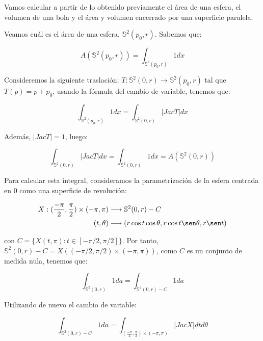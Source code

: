 Vamos calcular a partir de lo obtenido previamente el área de una esfera, el volumen de una bola y el área y volumen encerrado por una superficie paralela.

\begin{remark}
Veamos cuál es el área de una esfera, $\mathbb{S}^2(p_0, r)$. Sabemos que:

\begin{equation*}
    A(\mathbb{S}^2(p_0, r)) = \int_{\mathbb{S}^2(p_0, r)} 1dx
\end{equation*}

Consideremos la siguiente traslación: $T: \mathbb{S}^2(0, r) \longrightarrow \mathbb{S}^2(p_0, r)$ tal que $T(p) = p + p_0$, usando la fórmula del cambio de variable, tenemos que:

\begin{equation*}
    \int_{\mathbb{S}^2(p_0, r)} 1dx = \int_{\mathbb{S}^2(0, r)} |Jac T|dx 
\end{equation*}

Además, $|JacT|=1$, luego:

\begin{equation*}
    \int_{\mathbb{S}^2(0, r)} |Jac T|dx = \int_{\mathbb{S}^2(0, r)} 1dx = A(\mathbb{S}^2(0, r))
\end{equation*}

Para calcular esta integral, consideramos la parametrización de la esfera centrada en 0 como una superficie de revolución: 

\begin{align*}
    X: (\frac{-\pi}{2}, \frac{\pi}{2}) \times (-\pi, \pi) &\longrightarrow \mathbb{S}^2(0, r) - C \\
    (t, \theta) &\longrightarrow (r\cos t\cos\theta, r\cos t\sen\theta, r\sen t)
\end{align*}

con $C = \{X(t,\pi): t\in [-\pi/2, \pi/2]\}$. Por tanto, $\mathbb{S}^2(0, r) - C = X((-\pi/2, \pi/2) \times (-\pi, \pi))$, como $C$ es un conjunto de medida nula, tenemos que:

\begin{equation*}
    \int_{\mathbb{S}^2(0, r)} 1da = \int_{\mathbb{S}^2(0, r) - C} 1da
\end{equation*}

Utilizando de nuevo el cambio de variable:

\begin{equation*}
    \int_{\mathbb{S}^2(0, r) - C} 1da = \int_{(\frac{-\pi}{2}, \frac{\pi}{2}) \times (-\pi, \pi)} |JacX| dtd\theta
\end{equation*}


\end{remark}

